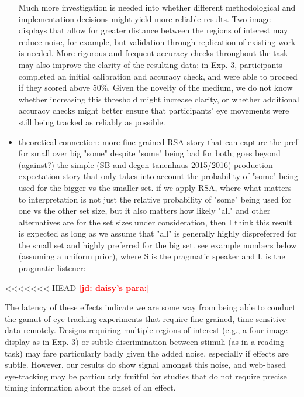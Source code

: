 \documentclass[10pt,letterpaper]{article}
\newcommand{\jd}[1]{\textcolor{Red}{\textbf{[jd: #1]}}}
\begin{document}
\begin{itemize}
Much more investigation is needed into whether different methodological and implementation decisions might yield more reliable results. Two-image displays that allow for greater distance between the regions of interest may reduce noise, for example, but validation through replication of existing work is needed. More rigorous and frequent accuracy checks throughout the task may also improve the clarity of the resulting data: in Exp. 3, participants completed an initial calibration and accuracy check, and were able to proceed if they scored above 50\%. Given the novelty of the medium, we do not know whether increasing this threshold might increase clarity, or whether additional accuracy checks might better ensure that participants' eye movements were still being tracked as reliably as possible. 

	\item theoretical connection: more fine-grained RSA story that can capture the pref for small over big "some" despite "some" being bad for both; goes beyond (against?) the simple (SB and degen tanenhaus 2015/2016) production expectation story that only takes into account the probability of "some" being used for the bigger vs the smaller set. if we apply RSA, where what matters to interpretation is not just the relative probability of "some" being used for one vs the other set size, but it also matters how likely "all" and other alternatives are for the set sizes under consideration, then I think this result is expected as long as we assume that "all" is generally highly dispreferred for the small set and highly preferred for the big set. see example numbers below (assuming a uniform prior), where S is the pragmatic speaker and L is the pragmatic listener:
\end{itemize}


<<<<<<< HEAD
\jd{daisy's para:}

The latency of these effects indicate we are some way from being able to conduct the gamut of eye-tracking experiments that require fine-grained, time-sensitive data remotely. Designs requiring multiple regions of interest (e.g., a four-image display as in Exp. 3) or subtle discrimination between stimuli (as in a reading task) may fare particularly badly given the added noise, especially if effects are subtle. However, our results do show signal amongst this noise, and web-based eye-tracking may be particularly fruitful for studies that do not require precise timing information about the onset of an effect. 
\end{document}

